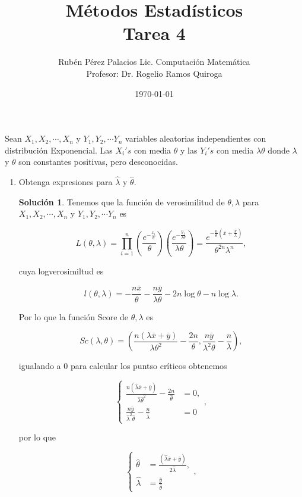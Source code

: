 \documentclass[letterpaper]{article}
\title{Métodos Estadísticos \\ Tarea 4}
\author{Rubén Pérez Palacios Lic. Computación Matemática\\Profesor: Dr. Rogelio Ramos Quiroga}
\date{\today}
\theoremstyle{definition}
\theoremstyle{lemathm}
\theoremstyle{lemathm}
\newtheorem{sol}{Solución}
\theoremstyle{lemathm}
\theoremstyle{lemademthm}
\newcommand{\txty}{\text{ y }}
\newcommand{\pars}[1]{\left( #1 \right) }
\newcommand{\1}{\mathbbm{1}}
\begin{document}
	\maketitle
	
	Sean $X_1,X_2,\cdots,X_n$ y $Y_1,Y_2,\cdots Y_n$ variables aleatorias independientes con distribución Exponencial. Las $X_i's$ con media $\theta$ y las $Y_i's$ con media $\lambda\theta$ donde $\lambda$ y $\theta$ son constantes positivas, pero desconocidas.

	\begin{enumerate}
		\item Obtenga expresiones para $\hat{\lambda} \txty \hat{\theta}$.
		
		\begin{sol}
			Tenemos que la función de verosimilitud de $\theta,\lambda$ para $X_1,X_2,\cdots,X_n$ y $Y_1,Y_2,\cdots Y_n$ es

			\[L\pars{\theta, \lambda} = \prod_{i=1}^n \pars{\frac{e^{-\frac{x_i}{\theta}}}{\theta}}\pars{\frac{e^{-\frac{y_1}{\lambda\theta}}}{\lambda\theta}} = \frac{e^{-\frac{n}{\theta}\pars{\overline{x}+\frac{\overline{y}}{\lambda}}}}{\theta^{2n}\lambda^n},\]

			cuya logverosimiltud es

			\[l\pars{\theta, \lambda} = - \frac{n\overline{x}}{\theta} - \frac{n\overline{y}}{\lambda\theta} - 2n\log{\theta} - n\log{\lambda}.\]

			Por lo que la función Score de $\theta,\lambda$ es

			\[Sc\pars{\lambda,\theta} = \pars{\frac{n\pars{\lambda\overline{x} + \overline{y}}}{\lambda\theta^2} - \frac{2n}{\theta}, \frac{n\overline{y}}{\lambda^2\theta} - \frac{n}{\lambda}},\]

			igualando a $0$ para calcular los puntso críticos obtenemos

			\[\begin{cases}
				\frac{n\pars{\hat{\lambda}\overline{x} + \overline{y}}}{\hat{\lambda}\hat{\theta}^2} - \frac{2n}{\hat{\theta}} &= 0,\\[1ex]
				\frac{n\overline{y}}{\hat{\lambda}^2\hat{\theta}} - \frac{n}{\hat{\lambda}} &= 0
			\end{cases},\]

			por lo que

			\[\begin{cases}
				\hat{\theta} &= \frac{\pars{\hat{\lambda}\overline{x} + \overline{y}}}{2\hat{\lambda}},\\[1ex]
				\hat{\lambda} &= \frac{\overline{y}}{\hat{\theta}}
			\end{cases},\]


\end{sol}
\end{enumerate}
\end{document}
